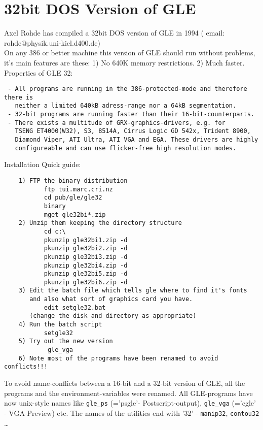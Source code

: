 \section{32bit DOS Version of GLE}
Axel Rohde has compiled a 32bit DOS version of GLE in 1994 
( email: rohde@physik.uni-kiel.d400.de)\\
On any 386 or better machine this version of GLE should 
run without problems, it's main features are these:
1) No 640K memory restrictions. 2) Much faster.\\
\clearpage
Properties of GLE 32:
\begin{verbatim}
 - All programs are running in the 386-protected-mode and therefore there is
   neither a limited 640kB adress-range nor a 64kB segmentation.
 - 32-bit programs are running faster than their 16-bit-counterparts.
 - There exists a multitude of GRX-graphics-drivers, e.g. for
   TSENG ET4000(W32), S3, 8514A, Cirrus Logic GD 542x, Trident 8900,
   Diamond Viper, ATI Ultra, ATI VGA and EGA. These drivers are highly
   configureable and can use flicker-free high resolution modes.
\end{verbatim}
Installation Quick guide:
\begin{verbatim}
    1) FTP the binary distribution
           ftp tui.marc.cri.nz
           cd pub/gle/gle32
           binary
           mget gle32bi*.zip
    2) Unzip them keeping the directory structure
           cd c:\
           pkunzip gle32bi1.zip -d
           pkunzip gle32bi2.zip -d
           pkunzip gle32bi3.zip -d
           pkunzip gle32bi4.zip -d
           pkunzip gle32bi5.zip -d
           pkunzip gle32bi6.zip -d
    3) Edit the batch file which tells gle where to find it's fonts
       and also what sort of graphics card you have.  
           edit setgle32.bat
       (change the disk and directory as appropriate)
    4) Run the batch script
           setgle32
    5) Try out the new version
            gle_vga
    6) Note most of the programs have been renamed to avoid conflicts!!!
\end{verbatim}

To avoid name-conflicts between a 16-bit and a 32-bit version of GLE, 
all the programs and the environment-variables were renamed. 
All GLE-programs have now unix-style names like \verb#gle_ps# (='psgle'-
Postscript-output), \verb#gle_vga# (='cgle' - VGA-Preview) etc. The names 
of the utilities end with '32' -  \verb#manip32#, \verb#contou32# \dots


